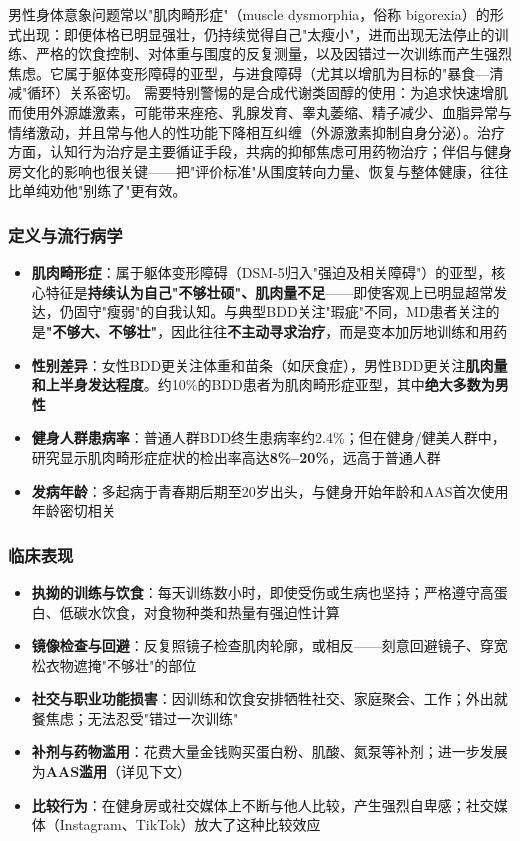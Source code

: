 男性身体意象问题常以"肌肉畸形症"（muscle dysmorphia，俗称 bigorexia）的形式出现：即便体格已明显强壮，仍持续觉得自己"太瘦小"，进而出现无法停止的训练、严格的饮食控制、对体重与围度的反复测量，以及因错过一次训练而产生强烈焦虑。它属于躯体变形障碍的亚型，与进食障碍（尤其以增肌为目标的"暴食—清减"循环）关系密切。
需要特别警惕的是合成代谢类固醇的使用：为追求快速增肌而使用外源雄激素，可能带来痤疮、乳腺发育、睾丸萎缩、精子减少、血脂异常与情绪激动，并且常与他人的性功能下降相互纠缠（外源激素抑制自身分泌）。治疗方面，认知行为治疗是主要循证手段，共病的抑郁焦虑可用药物治疗；伴侣与健身房文化的影响也很关键——把"评价标准"从围度转向力量、恢复与整体健康，往往比单纯劝他"别练了"更有效。

\subsubsection{定义与流行病学}

\begin{itemize}[leftmargin=2cm]
	\item \textbf{肌肉畸形症}：属于躯体变形障碍（DSM-5归入"强迫及相关障碍"）的亚型，核心特征是\textbf{持续认为自己"不够壮硕"、肌肉量不足}——即使客观上已明显超常发达，仍固守"瘦弱"的自我认知。与典型BDD关注"瑕疵"不同，MD患者关注的是\textbf{"不够大、不够壮"}，因此往往\textbf{不主动寻求治疗}，而是变本加厉地训练和用药
	\item \textbf{性别差异}：女性BDD更关注体重和苗条（如厌食症），男性BDD更关注\textbf{肌肉量和上半身发达程度}。约10\%的BDD患者为肌肉畸形症亚型，其中\textbf{绝大多数为男性}
	\item \textbf{健身人群患病率}：普通人群BDD终生患病率约2.4\%；但在健身/健美人群中，研究显示肌肉畸形症症状的检出率高达\textbf{8\%--20\%}，远高于普通人群
	\item \textbf{发病年龄}：多起病于青春期后期至20岁出头，与健身开始年龄和AAS首次使用年龄密切相关
\end{itemize}

\subsubsection{临床表现}

\begin{itemize}[leftmargin=2cm]
	\item \textbf{执拗的训练与饮食}：每天训练数小时，即使受伤或生病也坚持；严格遵守高蛋白、低碳水饮食，对食物种类和热量有强迫性计算
	\item \textbf{镜像检查与回避}：反复照镜子检查肌肉轮廓，或相反——刻意回避镜子、穿宽松衣物遮掩"不够壮"的部位
	\item \textbf{社交与职业功能损害}：因训练和饮食安排牺牲社交、家庭聚会、工作；外出就餐焦虑；无法忍受"错过一次训练"
	\item \textbf{补剂与药物滥用}：花费大量金钱购买蛋白粉、肌酸、氮泵等补剂；进一步发展为\textbf{AAS滥用}（详见下文）
	\item \textbf{比较行为}：在健身房或社交媒体上不断与他人比较，产生强烈自卑感；社交媒体（Instagram、TikTok）放大了这种比较效应
\end{itemize}

